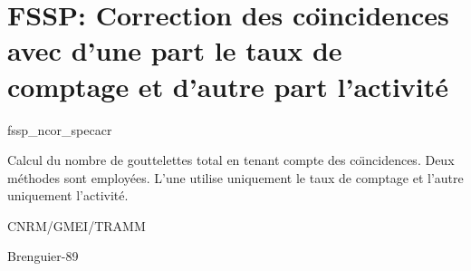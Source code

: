 %
\section{FSSP: Correction des co\"{\i}ncidences avec d'une part le
taux de comptage et d'autre part l'activit\'e }

 {\sf fssp\_ncor\_specacr}

Calcul du nombre de gouttelettes total en tenant
compte des co\"{\i}ncidences. Deux m\'ethodes
sont employ\'ees. L'une utilise uniquement le taux
de comptage et l'autre uniquement l'activit\'e.

\bigskip





CNRM/GMEI/TRAMM

Brenguier-89 \cite{Brenguier-89}
